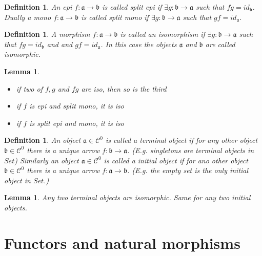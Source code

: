 \documentclass{article}
\newcommand{\cat}[1]{\mathcal{#1}} %
\newcommand{\cato}[1]{\cat{#1}^0} %
\newcommand{\ob}[1]{\mathfrak{#1}} %
\newtheorem{lemma}[theorem]{Lemma}
\newtheorem{definition}[theorem]{Definition}
\begin{document}
\begin{definition}
	An epi $f: \ob{a} \rightarrow \ob{b}$ is called \emph{split epi} if $\exists g: \ob{b} \rightarrow \ob{a}$ such that $fg = id_{\ob{b}}$. Dually a mono $f: \ob{a} \rightarrow \ob{b}$ is called \emph{split mono} if $\exists g: \ob{b} \rightarrow \ob{a}$ such that $gf = id_{\ob{a}}$.
\end{definition}

\begin{definition}
	A morphism $f: \ob{a} \rightarrow \ob{b}$ is called an \emph{isomorphism} if $\exists g: \ob{b} \rightarrow \ob{a}$ such that $fg = id_{\ob{b}}$ and and $gf = id_{\ob{a}}$. In this case the objects $\ob{a}$ and $\ob{b}$ are called \emph{isomorphic}.
\end{definition}

\begin{lemma}
	\begin{itemize}
		\item if two of $f, g$ and $fg$ are iso, then so is the third
		\item if $f$ is epi and split mono, it is iso
		\item if $f$ is split epi and mono, it is iso
	\end{itemize}
\end{lemma}

\begin{definition}
	An object $\ob{a} \in \cato{C}$ is called a \emph{terminal object} if for any other object $\ob{b} \in \cato{C}$ there is a unique arrow $f: \ob{b} \rightarrow \ob{a}$. (E.g. singletons are terminal objects in $Set$) Similarly an object $\ob{a} \in \cato{C}$ is called a \emph{initial object} if for ano other object $\ob{b} \in \cato{C}$ there is a unique arrow $f: \ob{a} \rightarrow \ob{b}$. (E.g. the empty set is the only initial object in $Set$.)
\end{definition}

\begin{lemma}
	Any two terminal objects are isomorphic. Same for any two initial objects.
\end{lemma}





\section{Functors and natural morphisms}
\end{document}
